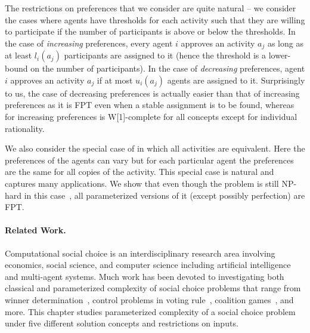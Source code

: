The restrictions on preferences that we consider are quite natural -- we consider the cases where agents have thresholds for each activity such that they are willing to participate if the number of participants is above or below the thresholds. In the case of {\em increasing} preferences, every agent $i$ approves an activity $a_j$ as long as at least $l_i(a_j)$ participants are assigned to it (hence the threshold is a lower-bound on the number of participants). In the case of {\em decreasing} preferences, agent $i$ approves an activity $a_j$ if at most $u_{i}(a_j)$ agents are assigned to it. Surprisingly to us, the case of decreasing preferences is actually easier than that of increasing preferences as it is FPT even when a stable assignment is to be found, whereas \GASPs for increasing preferences is W[1]-complete for all concepts except for individual rationality.

We also consider the special case of \GASPs in which all activities are equivalent. Here the preferences of the agents can vary but for each particular agent the preferences are the same for all copies of the activity. This special case is natural and captures many applications. We show that even though the problem is still NP-hard in this case~\cite{GASP12WINE}, all parameterized versions of it (except possibly perfection) are FPT. 

\paragraph{Related Work.}
Computational social choice is an interdisciplinary research area involving economics, social science, and computer science including artificial intelligence and multi-agent systems. Much work has been devoted to investigating both classical and parameterized complexity of social choice problems that range from winner determination~\cite{xia2014fixed,liu2016parameterized,betzler2010parameterized}, control problems in voting rule~\cite{erdelyi2010parameterized,hemaspaandra2013schulze,endriss2015parameterized}, coalition games~\cite{shrot2009easy,chitnis2011parameterized}, and more. This chapter studies parameterized complexity of a social choice problem under five different solution concepts and restrictions on inputs. 

